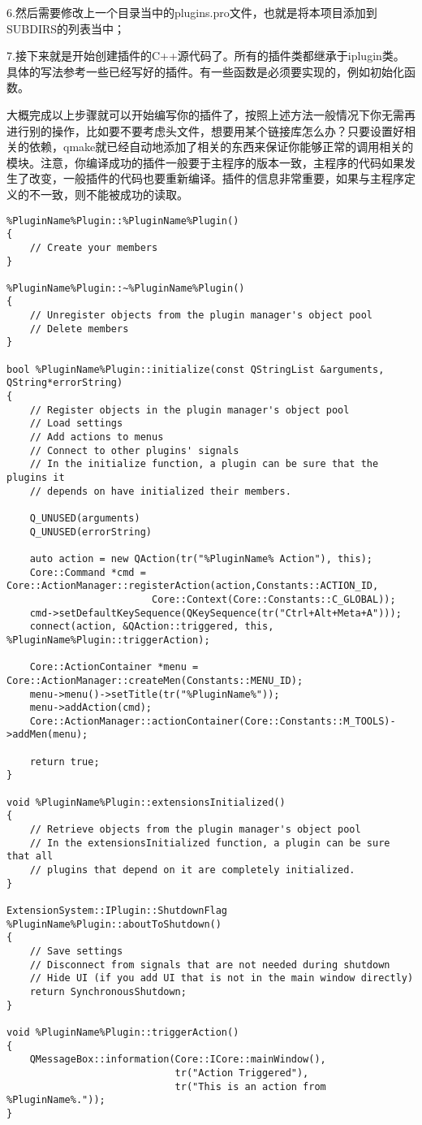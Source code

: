 6.然后需要修改上一个目录当中的plugins.pro文件，也就是将本项目添加到SUBDIRS的列表当中；

7.接下来就是开始创建插件的C++源代码了。所有的插件类都继承于iplugin类。具体的写法参考一些已经写好的插件。有一些函数是必须要实现的，例如初始化函数。

大概完成以上步骤就可以开始编写你的插件了，按照上述方法一般情况下你无需再进行别的操作，比如要不要考虑头文件，想要用某个链接库怎么办？只要设置好相关的依赖，qmake就已经自动地添加了相关的东西来保证你能够正常的调用相关的模块。注意，你编译成功的插件一般要于主程序的版本一致，主程序的代码如果发生了改变，一般插件的代码也要重新编译。插件的信息非常重要，如果与主程序定义的不一致，则不能被成功的读取。

\begin{lstlisting}
%PluginName%Plugin::%PluginName%Plugin()
{
    // Create your members
}

%PluginName%Plugin::~%PluginName%Plugin()
{
    // Unregister objects from the plugin manager's object pool
    // Delete members
}

bool %PluginName%Plugin::initialize(const QStringList &arguments, QString*errorString)
{
    // Register objects in the plugin manager's object pool
    // Load settings
    // Add actions to menus
    // Connect to other plugins' signals
    // In the initialize function, a plugin can be sure that the plugins it
    // depends on have initialized their members.

    Q_UNUSED(arguments)
    Q_UNUSED(errorString)

    auto action = new QAction(tr("%PluginName% Action"), this);
    Core::Command *cmd = Core::ActionManager::registerAction(action,Constants::ACTION_ID,
                         Core::Context(Core::Constants::C_GLOBAL));
    cmd->setDefaultKeySequence(QKeySequence(tr("Ctrl+Alt+Meta+A")));
    connect(action, &QAction::triggered, this, %PluginName%Plugin::triggerAction);

    Core::ActionContainer *menu = Core::ActionManager::createMen(Constants::MENU_ID);
    menu->menu()->setTitle(tr("%PluginName%"));
    menu->addAction(cmd);
    Core::ActionManager::actionContainer(Core::Constants::M_TOOLS)->addMen(menu);

    return true;
}
    
void %PluginName%Plugin::extensionsInitialized()
{
    // Retrieve objects from the plugin manager's object pool
    // In the extensionsInitialized function, a plugin can be sure that all
    // plugins that depend on it are completely initialized.
}

ExtensionSystem::IPlugin::ShutdownFlag %PluginName%Plugin::aboutToShutdown()
{
    // Save settings
    // Disconnect from signals that are not needed during shutdown
    // Hide UI (if you add UI that is not in the main window directly)
    return SynchronousShutdown;
}

void %PluginName%Plugin::triggerAction()
{
    QMessageBox::information(Core::ICore::mainWindow(),
                             tr("Action Triggered"),
                             tr("This is an action from %PluginName%."));
}   
\end{lstlisting}

